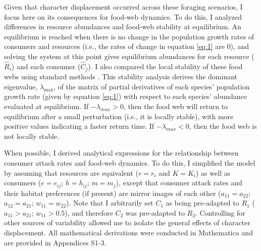 \documentclass[11pt,]{article}
\begin{document}
Given that character displacement occurred across these foraging
scenarios, I focus here on its consequences for food-web dynamics. To do
this, I analyzed differences in resource abundances and food-web
stability at equilibrium. An equilibrium is reached when there is no
change in the population growth rates of consumers and resources (i.e.,
the rates of change in equation \ref{eq:1} are 0), and solving the
system at this point gives equilibrium abundances for each resource
(\(\hat R_i\)) and each consumer (\(\hat C_j\)). I also compared the
local stability of these food webs using standard methods
\citep{Otto2007}. This stability analysis derives the dominant
eigenvalue, \(\lambda_{\text{max}}\), of the matrix of partial
derivatives of each species' population growth rate (given by equation
\ref{eq:1}) with respect to each species' abundance evaluated at
equilibrium. If \(-\lambda_{max}>0\), then the food web will return to
equilibrium after a small perturbation (i.e., it is locally stable),
with more positive values indicating a faster return time. If
\(-\lambda_{max}<0\), then the food web is not locally stable.

When possible, I derived analytical expressions for the relationship
between consumer attack rates and food-web dynamics. To do this, I
simplified the model by assuming that resources are equivalent
(\(r=r_i\) and \(K=K_i\)) as well as consumers (\(e=e_{ij}\);
\(h=h_{ij}\); \(m=m_j\)), except that consumer attack rates and their
habitat preferences (if present) are mirror images of each other
(\(a_{11}=a_{22}\); \(a_{12}=a_{21}\); \(w_{11}=w_{22}\)). Note that I
arbitrarily set \(C_1\) as being pre-adapted to \(R_1\)
(\(a_{11} > a_{21}\); \(w_{11} > 0.5\)), and therefore \(C_2\) was
pre-adapted to \(R_2\). Controlling for other sources of variability
allowed me to isolate the general effects of character displacement. All
mathematical derivations were conducted in Mathematica
\citep{Mathematica} and are provided in Appendices S1-3.
\end{document}

